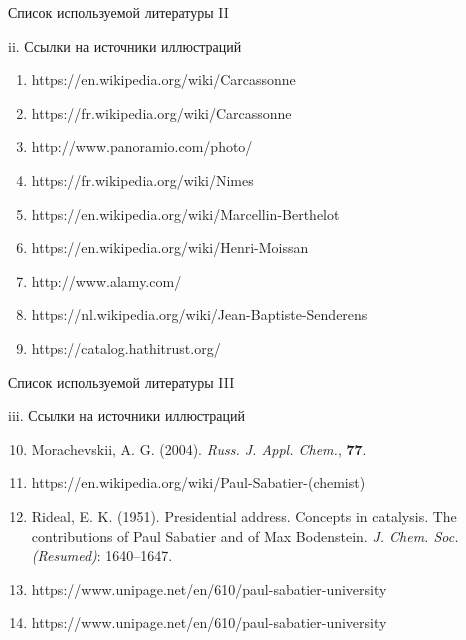 \documentclass[hyperref={pdfpagelabel=false},usepdftitle=false,xcolor=dvipsnames]{beamer}
\begin{document}
\begin{frame}{Список используемой литературы II}
		\begin{block}{ii. Ссылки на источники иллюстраций}
			\begin{enumerate}
				\item https://en.wikipedia.org/wiki/Carcassonne
				\item https://fr.wikipedia.org/wiki/Carcassonne
				\item http://www.panoramio.com/photo/ 
				\item https://fr.wikipedia.org/wiki/Nimes
				\item https://en.wikipedia.org/wiki/Marcellin-Berthelot
				\item https://en.wikipedia.org/wiki/Henri-Moissan 
				\item http://www.alamy.com/
				\item https://nl.wikipedia.org/wiki/Jean-Baptiste-Senderens
				\item https://catalog.hathitrust.org/ 
			\end{enumerate}
		\end{block}
\end{frame}

\begin{frame}{Список используемой литературы III}
	\begin{block}{iii. Ссылки на источники иллюстраций}
		\begin{enumerate}
			\setcounter{enumi}{9}	
			\item Morachevskii, A. G. (2004). \textit{Russ. J. Appl. Chem.}, \textbf{77}.
			\item https://en.wikipedia.org/wiki/Paul-Sabatier-(chemist) 
			\item Rideal, E. K. (1951). Presidential address. Concepts in catalysis. The contributions of Paul Sabatier and of Max Bodenstein. \textit{J. Chem. Soc. (Resumed)}: 1640–1647.
			\item https://www.unipage.net/en/610/paul-sabatier-university
			\item https://www.unipage.net/en/610/paul-sabatier-university 
		\end{enumerate}
	\end{block}
\end{frame}
\end{document}
